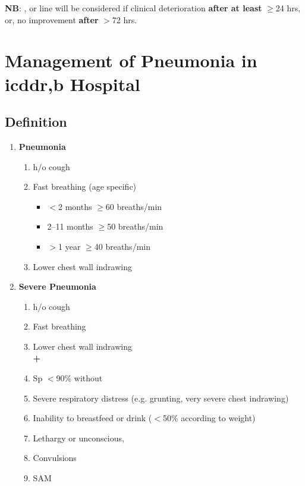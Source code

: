 \documentclass[11pt,a4paper]{report}
\begin{document}
\noindent \textbf{NB}: ,  or  line will be considered if clinical deterioration \textbf{after at least} $\geq$24 hrs, \\
or, no improvement \textbf{after} $>$72 hrs.


\newpage
\section[Pneumonia \& Severe Pneumonia]{Management of Pneumonia in icddr,b Hospital}
\subsection{Definition}
\begin{enumerate}
	\item \textbf{Pneumonia}
	\begin{enumerate}
		\item h/o cough 
		\item Fast breathing (age specific)
		\begin{itemize}
			\item $<$2 months $\geq$60 breaths/min
			\item 2--11 months $\geq$50 breaths/min
			\item $>$1 year $\geq$40 breaths/min
		\end{itemize}
		\item Lower chest wall indrawing 
	\end{enumerate}
	\item \textbf{Severe Pneumonia}
	\begin{enumerate}
		\item h/o cough
		\item Fast breathing 
		\item Lower chest wall indrawing \\
		\textbf{+}
		\item Sp $<$90\% without 
		\item Severe respiratory distress (e.g. grunting, very severe chest indrawing) 
		\item Inability to breastfeed or drink ($<$50\% according to weight)
		\item Lethargy or unconscious,
		\item Convulsions
		\item SAM 
	\end{enumerate}
\end{enumerate}
\end{document}
